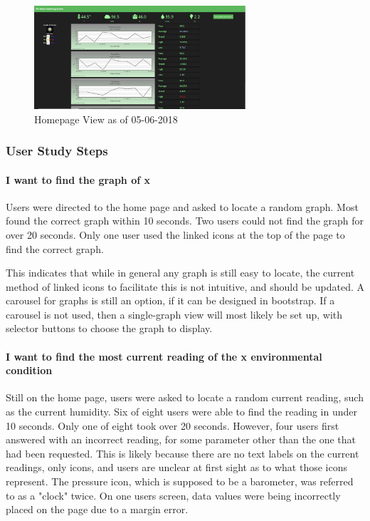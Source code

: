 \documentclass[IEEEtran,letterpaper,10pt,titlepage,fleqn,draftclsnofoot,onecolumn]{article}
\begin{document}
\begin{figure}
  \caption{Homepage View as of 05-06-2018}
  \centering
    \includegraphics[width=0.7\textwidth]{homepage}
\end{figure}

\subsubsection{User Study Steps}

\paragraph{I want to find the graph of x}

Users were directed to the home page and asked to locate a random graph. Most found the correct graph within 10 seconds. Two users could not find the graph for over 20 seconds. Only one user used the linked icons at the top of the page to find the correct graph. 

This indicates that while in general any graph is still easy to locate, the current method of linked icons to facilitate this is not intuitive, and should be updated. A carousel for graphs is still an option, if it can be designed in bootstrap. If a carousel is not used, then a single-graph view will most likely be set up, with selector buttons to choose the graph to display. 

\paragraph{I want to find the most current reading of the x environmental condition}

Still on the home page, users were asked to locate a random current reading, such as the current humidity. Six of eight users were able to find the reading in under 10 seconds. Only one of eight took over 20 seconds. However, four users first answered with an incorrect reading, for some parameter other than the one that had been requested. This is likely because there are no text labels on the current readings, only icons, and users are unclear at first sight as to what those icons represent. The pressure icon, which is supposed to be a barometer, was referred to as a "clock" twice. On one users screen, data values were being incorrectly placed on the page due to a margin error. 
\end{document}
